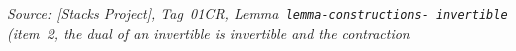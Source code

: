 \begin{lemma}\leanok
  \label{lem:tensorobj_inverse_invertible}
  \textit{Source: [Stacks Project], Tag~01CR, Lemma~\texttt{lemma-constructions-%
  invertible} (item~2, the dual of an invertible is invertible and the contraction
}
\end{lemma}
